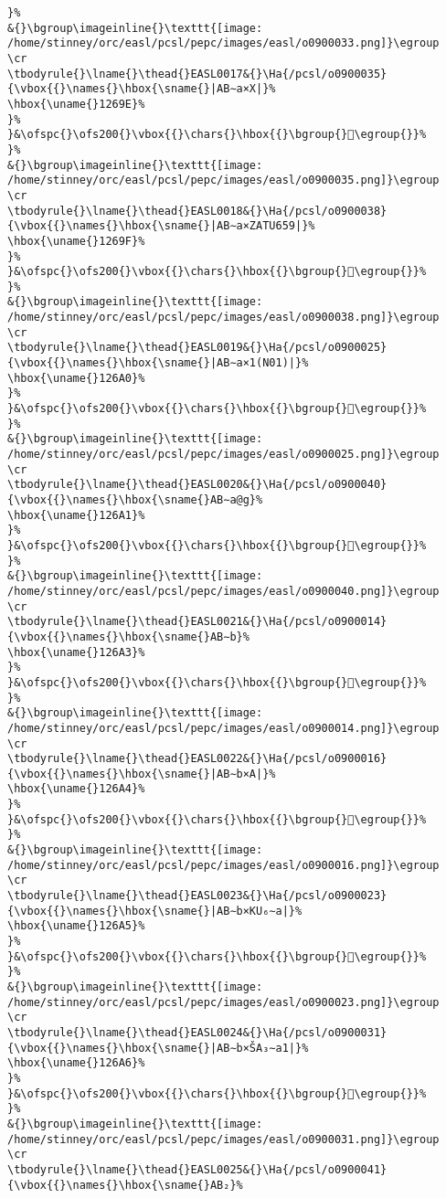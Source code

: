 \begin{verbatim}
}%
&{}\bgroup\imageinline{}\texttt{[image: /home/stinney/orc/easl/pcsl/pepc/images/easl/o0900033.png]}\egroup
\cr
\tbodyrule{}\lname{}\thead{}EASL0017&{}\Ha{/pcsl/o0900035}{\vbox{{}\names{}\hbox{\sname{}|AB∼a×X|}%
\hbox{\uname{}1269E}%
}%
}&\ofspc{}\ofs200{}\vbox{{}\chars{}\hbox{{}\bgroup{}𒚞\egroup{}}%
}%
&{}\bgroup\imageinline{}\texttt{[image: /home/stinney/orc/easl/pcsl/pepc/images/easl/o0900035.png]}\egroup
\cr
\tbodyrule{}\lname{}\thead{}EASL0018&{}\Ha{/pcsl/o0900038}{\vbox{{}\names{}\hbox{\sname{}|AB∼a×ZATU659|}%
\hbox{\uname{}1269F}%
}%
}&\ofspc{}\ofs200{}\vbox{{}\chars{}\hbox{{}\bgroup{}𒚟\egroup{}}%
}%
&{}\bgroup\imageinline{}\texttt{[image: /home/stinney/orc/easl/pcsl/pepc/images/easl/o0900038.png]}\egroup
\cr
\tbodyrule{}\lname{}\thead{}EASL0019&{}\Ha{/pcsl/o0900025}{\vbox{{}\names{}\hbox{\sname{}|AB∼a×1(N01)|}%
\hbox{\uname{}126A0}%
}%
}&\ofspc{}\ofs200{}\vbox{{}\chars{}\hbox{{}\bgroup{}𒚠\egroup{}}%
}%
&{}\bgroup\imageinline{}\texttt{[image: /home/stinney/orc/easl/pcsl/pepc/images/easl/o0900025.png]}\egroup
\cr
\tbodyrule{}\lname{}\thead{}EASL0020&{}\Ha{/pcsl/o0900040}{\vbox{{}\names{}\hbox{\sname{}AB∼a@g}%
\hbox{\uname{}126A1}%
}%
}&\ofspc{}\ofs200{}\vbox{{}\chars{}\hbox{{}\bgroup{}𒚡\egroup{}}%
}%
&{}\bgroup\imageinline{}\texttt{[image: /home/stinney/orc/easl/pcsl/pepc/images/easl/o0900040.png]}\egroup
\cr
\tbodyrule{}\lname{}\thead{}EASL0021&{}\Ha{/pcsl/o0900014}{\vbox{{}\names{}\hbox{\sname{}AB∼b}%
\hbox{\uname{}126A3}%
}%
}&\ofspc{}\ofs200{}\vbox{{}\chars{}\hbox{{}\bgroup{}𒚣\egroup{}}%
}%
&{}\bgroup\imageinline{}\texttt{[image: /home/stinney/orc/easl/pcsl/pepc/images/easl/o0900014.png]}\egroup
\cr
\tbodyrule{}\lname{}\thead{}EASL0022&{}\Ha{/pcsl/o0900016}{\vbox{{}\names{}\hbox{\sname{}|AB∼b×A|}%
\hbox{\uname{}126A4}%
}%
}&\ofspc{}\ofs200{}\vbox{{}\chars{}\hbox{{}\bgroup{}𒚤\egroup{}}%
}%
&{}\bgroup\imageinline{}\texttt{[image: /home/stinney/orc/easl/pcsl/pepc/images/easl/o0900016.png]}\egroup
\cr
\tbodyrule{}\lname{}\thead{}EASL0023&{}\Ha{/pcsl/o0900023}{\vbox{{}\names{}\hbox{\sname{}|AB∼b×KU₆∼a|}%
\hbox{\uname{}126A5}%
}%
}&\ofspc{}\ofs200{}\vbox{{}\chars{}\hbox{{}\bgroup{}𒚥\egroup{}}%
}%
&{}\bgroup\imageinline{}\texttt{[image: /home/stinney/orc/easl/pcsl/pepc/images/easl/o0900023.png]}\egroup
\cr
\tbodyrule{}\lname{}\thead{}EASL0024&{}\Ha{/pcsl/o0900031}{\vbox{{}\names{}\hbox{\sname{}|AB∼b×ŠA₃∼a1|}%
\hbox{\uname{}126A6}%
}%
}&\ofspc{}\ofs200{}\vbox{{}\chars{}\hbox{{}\bgroup{}𒚦\egroup{}}%
}%
&{}\bgroup\imageinline{}\texttt{[image: /home/stinney/orc/easl/pcsl/pepc/images/easl/o0900031.png]}\egroup
\cr
\tbodyrule{}\lname{}\thead{}EASL0025&{}\Ha{/pcsl/o0900041}{\vbox{{}\names{}\hbox{\sname{}AB₂}%

\end{verbatim}
